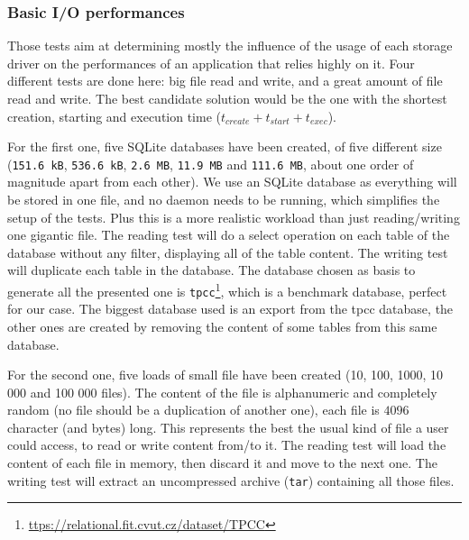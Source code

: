 \subsubsection{Basic I/O performances}
Those tests aim at determining mostly the influence of the usage of each storage driver on the performances of an application that relies highly on it.  Four different tests are done here: big file read and write, and a great amount of file read and write.  The best candidate solution would be the one with the shortest creation, starting and execution time ($t_{create} + t_{start} + t_{exec}$).

For the first one, five SQLite databases have been created, of five different size (\texttt{151.6 kB}, \texttt{536.6 kB}, \texttt{2.6 MB}, \texttt{11.9 MB} and \texttt{111.6 MB}, about one order of magnitude apart from each other).  We use an SQLite database as everything will be stored in one file, and no daemon needs to be running, which simplifies the setup of the tests.  Plus this is a more realistic workload than just reading/writing one gigantic file.
The reading test will do a select operation on each table of the database without any filter, displaying all of the table content.  The writing test will duplicate each table in the database.  The database chosen as basis to generate all the presented one is \texttt{tpcc}\footnote{\href{https://relational.fit.cvut.cz/dataset/TPCC}{ttps://relational.fit.cvut.cz/dataset/TPCC}}, which is a benchmark database, perfect for our case.  The biggest database used is an export from the tpcc database, the other ones are created by removing the content of some tables from this same database.

For the second one, five loads of small file have been created (10, 100, 1000, 10 000 and 100 000 files).  The content of the file is alphanumeric and completely random (no file should be a duplication of another one), each file is $4096$ character (and bytes) long.  This represents the best the usual kind of file a user could access, to read or write content from/to it. 
The reading test will load the content of each file in memory, then discard it and move to the next one.  The writing test will extract an uncompressed archive (\texttt{tar}) containing all those files.

